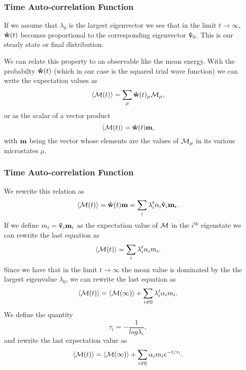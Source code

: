 \frame
{
  \frametitle{Time Auto-correlation Function}
\begin{small}
{\scriptsize
If we assume that $\lambda_0$ is the largest eigenvector we see that in the limit $t\rightarrow \infty$,
${\bf \hat{w}}(t)$ becomes proportional to the corresponding eigenvector 
${\bf \hat{v}}_0$. This is our steady state or final distribution. 

We can relate this property to an observable like the mean energy.
With the probabilty ${\bf \hat{w}}(t)$ (which in our case is the squared trial wave function) we
can write the expectation values as 
\[
 \langle {\cal M}(t) \rangle  = \sum_{\mu} {\bf \hat{w}}(t)_{\mu}{\cal M}_{\mu},
\]  
or as the scalar of a  vector product
 \[
 \langle {\cal M}(t) \rangle  = {\bf \hat{w}}(t){\bf m},
\]  
with ${\bf m}$ being the vector whose elements are the values of ${\cal M}_{\mu}$ in its 
various microstates $\mu$.
}
\end{small}
}


\frame
{
  \frametitle{Time Auto-correlation Function}
\begin{small}
{\scriptsize
We rewrite this relation  as
 \[
 \langle {\cal M}(t) \rangle  = {\bf \hat{w}}(t){\bf m}=\sum_i\lambda_i^t\alpha_i{\bf \hat{v}}_i{\bf m}_i.
\]  
If we define $m_i={\bf \hat{v}}_i{\bf m}_i$ as the expectation value of
${\cal M}$ in the $i^{\mathrm{th}}$ eigenstate we can rewrite the last equation as
 \[
 \langle {\cal M}(t) \rangle  = \sum_i\lambda_i^t\alpha_im_i.
\] 
Since we have that in the limit $t\rightarrow \infty$ the mean value is dominated by the 
the largest eigenvalue $\lambda_0$, we can rewrite the last equation as
 \[
 \langle {\cal M}(t) \rangle  = \langle {\cal M}(\infty) \rangle+\sum_{i\ne 0}\lambda_i^t\alpha_im_i.
\] 
We define the quantity
\[
   \tau_i=-\frac{1}{log\lambda_i},
\]
and rewrite the last expectation value as
 \[
 \langle {\cal M}(t) \rangle  = \langle {\cal M}(\infty) \rangle+\sum_{i\ne 0}\alpha_im_ie^{-t/\tau_i}.
\label{eq:finalmeanm}
\] 
}
\end{small}
}


